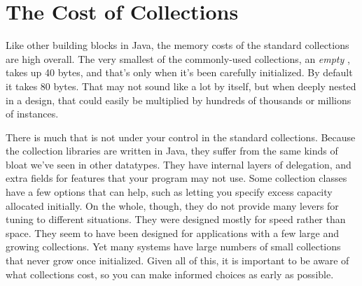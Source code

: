 \begin{description}

\end{description}


\section{The Cost of Collections}
\label{sec:designing-with-collections}

Like other
building blocks in Java, the memory costs of the standard collections are high overall. 
The very smallest of the commonly-used collections, an \emph{empty}
, takes up 40 bytes, and that's only when it's been carefully
initialized. By default it takes 80 bytes. That may not sound like a lot by
itself, but when deeply nested in a design, that could easily be multiplied
by hundreds of thousands or millions of instances.  

There is much that is not under your control in the standard collections.
Because the collection libraries are written in Java, they suffer
from the same kinds of bloat we've seen in other datatypes. They have
internal layers of delegation, and extra fields for features that your program
may not use. Some
collection classes have a few options that can help, such as
letting you specify excess capacity allocated initially. On the
whole, though, they do not provide many levers for tuning to different situations. They were
designed mostly for speed rather than space. They seem to have been designed
for applications with a few large and growing collections. Yet many systems have large numbers
of small collections that never grow once initialized. Given all of this, it is important
to be aware of what collections cost, so you can make informed choices as early as possible. 

